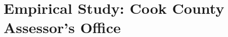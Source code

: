 \documentclass{article}
\theoremstyle{plain}
\theoremstyle{definition}
\newcommand{\1}{\mathbf{1}}
\begin{document}















\section{Empirical Study: Cook County Assessor's Office}
\label{sec:empirical}
\end{document}
